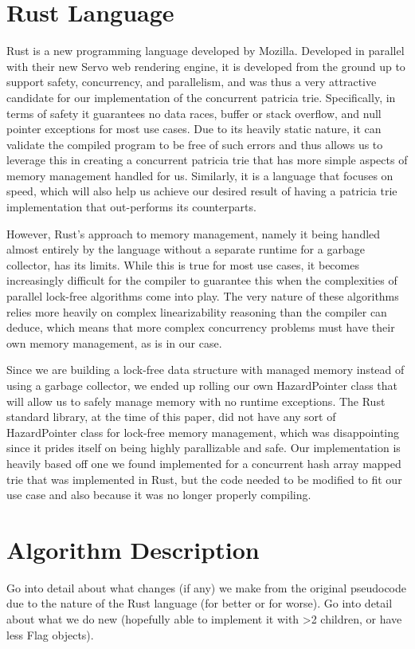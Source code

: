 \documentclass[conference]{IEEEtran}
\begin{document}
\section{Rust Language}
Rust is a new programming language developed by Mozilla. Developed in parallel with their new Servo web rendering engine, it is developed from the ground up to support safety, concurrency, and parallelism, and was thus a very attractive candidate for our implementation of the concurrent patricia trie.\cite{MozillaResearch} Specifically, in terms of safety it guarantees no data races, buffer or stack overflow, and null pointer exceptions for most use cases. Due to its heavily static nature, it can validate the compiled program to be free of such errors and thus allows us to leverage this in creating a concurrent patricia trie that has more simple aspects of memory management handled for us. Similarly, it is a language that focuses on speed, which will also help us achieve our desired result of having a patricia trie implementation that out-performs its counterparts. 
\par
However, Rust's approach to memory management, namely it being handled almost entirely by the language without a separate runtime for a garbage collector, has its limits. While this is true for most use cases, it becomes increasingly difficult for the compiler to guarantee this when the complexities of parallel lock-free algorithms come into play. The very nature of these algorithms relies more heavily on complex linearizability reasoning than the compiler can deduce, which means that more complex concurrency problems must have their own memory management, as is in our case.
\par
Since we are building a lock-free data structure with managed memory instead of using a garbage collector, we ended up rolling our own HazardPointer class that will allow us to safely manage memory with no runtime exceptions. The Rust standard library, at the time of this paper, did not have any sort of HazardPointer class for lock-free memory management, which was disappointing since it prides itself on being highly parallizable and safe. Our implementation is heavily based off one we found implemented for a concurrent hash array mapped trie that was implemented in Rust\cite{CHAMT}, but the code needed to be modified to fit our use case and also because it was no longer properly compiling.
\par


\section{Algorithm Description}
Go into detail about what changes (if any) we make from the original pseudocode due to the nature of the Rust language (for better or for worse). Go into detail about what we do new (hopefully able to implement it with >2 children, or have less Flag objects).
\end{document}
